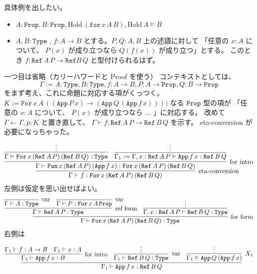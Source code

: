 具体例を出したい。
\begin{itemize}
  \item \(A : \texttt{Prop} , B : \texttt{Prop} , \text{Hold} \, (\texttt{for} \, x \, A \, B) , \text{Hold} \, A \vDash B\)
  \item \(A , B : \texttt{Type}\) , \(f : A \to B\) とする。\(P , Q : A , B\) 上の述語に対して 「任意の \(x : A\) について、 \(P(x)\) が成り立つなら \(Q(f(x))\) が成り立つ」とする。
  このとき \(f : \texttt{Ref} \, A \, P \to \texttt{Ref} B \, Q \) と型付けられるはず。
\end{itemize}
一つ目は省略（カリーハワードと Proof を使う）
コンテキストとしては、
  \[\Gamma := A : \texttt{Type} , B : \texttt{Type} , f : A \to B , P : A \to \texttt{Prop} , Q : B \to \texttt{Prop}\]
をまず考え、これに命題に対応する項がくっつく。
\(K := \texttt{For} \, x \, A \, ((\texttt{App} \, P \, x) \to (\texttt{App} \, Q \, (\texttt{App} \, f \, x))))\) なる \(\texttt{Prop}\) 型の項が 「任意の \(x : A\) について、 \(P(x)\) が成り立つなら \(\ldots\) 」に対応する。
改めて \(\Gamma \leftarrow \Gamma , p : K\) と置き直して、 \(\Gamma \vdash f : \texttt{Ref} \, A \, P \to \texttt{Ref} \, B \, Q\) を示す。
eta-conversion が必要になっちゃった。
\[
  \infer[\text{eta-conversion}]
  {\Gamma \vdash f : \texttt{For} \, x \, (\texttt{Ref} \, A \, P) \, (\texttt{Ref} \, B \, Q)}{
    \infer[\text{for intro}]
    {\Gamma \vdash \texttt{Fun} \, x \, (\texttt{Ref} \, A \, P) \, (\texttt{App} \, f \, x) : \texttt{For} \, x \, (\texttt{Ref} \, A \, P) \, (\texttt{Ref} \, B \, Q)}{
      \infer{\Gamma \vdash \texttt{For} \, x \, (\texttt{Ref} \, A \, P) \, (\texttt{Ref} \, B \, Q) : \texttt{Type}}{\vdots} &
      \infer{{\Gamma_1 := \Gamma , x : \texttt{Ref} \, A \, P \vdash \texttt{App} \, f \, x : \texttt{Ref} \, B \, Q}}{\vdots}
  }}
\]
左側は仮定を思い出せばよい。
\[\infer[\text{for form}]{\Gamma \vdash \texttt{For} \, x \, (\texttt{Ref} \, A \, P) \, (\texttt{Ref} \, B \, Q) : \texttt{Type}}{
  \infer[\text{ref form}]{\Gamma \vdash \texttt{Ref} \, A \, P : \texttt{Type}}
  {
    \infer[\text{var}]{\Gamma \vdash A : \texttt{Type}}{} &
    \infer[\text{var}]{\Gamma \vdash P : \texttt{For} \, x \, A \, \texttt{Prop}}{}
  } &
  \infer[]{\Gamma , x : \texttt{Ref} \, A \, P \vdash \texttt{Ref} \, B \, Q : \texttt{Type}}{\vdots}
}\]
右側は
\[\infer[]
  {\Gamma_1 \vdash \texttt{App} \, f \, x : \texttt{Ref} \, B \, Q}{
  \infer[\text{for intro}]
  {\Gamma_1 \vdash \texttt{App} \, f \, x : B}{
    \Gamma_1 \vdash f : A \to B & \Gamma_1 \vdash x : A} &
  \infer[\text{var}]
  {\Gamma_1 \vdash \texttt{Ref} \, B \, Q : \texttt{Type} }{\vdots} &
  \infer[X_1]
  {\Gamma_1 \vDash \texttt{App} \, Q \, (\texttt{App} \, f \, x)}{
  \vdots
  }
}\]
